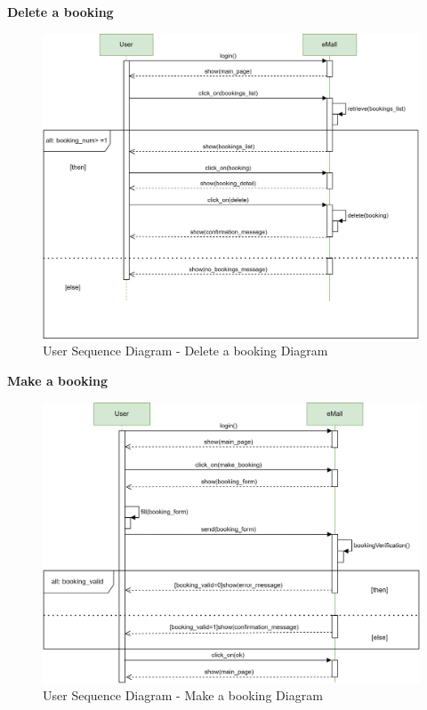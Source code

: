 \documentclass[table, 12pt]{article} %
\begin{document}
\begin{itemize}
            \textbf{Delete a booking}
            \begin{center}
                \begin{figure}[H]
                    \includegraphics[scale=0.55, center]{assets/sequenceDiagrams/Booking deletion sequence.png}
                    \caption{User Sequence Diagram - Delete a booking Diagram}
                    \label{fig: Delete a booking}
                \end{figure}
            \end{center}

            \textbf{Make a booking}
            \begin{center}
                \begin{figure}[H]
                    \includegraphics[scale=0.55, center]{assets/sequenceDiagrams/Make a booking.png}
                    \caption{User Sequence Diagram - Make a booking Diagram}
                    \label{fig: Make a booking}
                \end{figure}
            \end{center}


\end{itemize}
\end{document}
